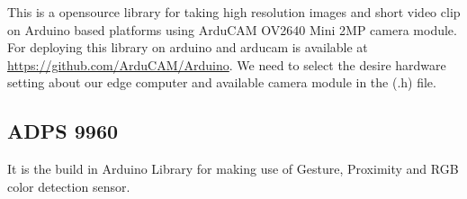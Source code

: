 {This is a opensource library for taking high resolution images and short video clip on Arduino based platforms using ArduCAM OV2640 Mini 2MP camera module. For deploying this library on arduino and arducam is available at \url{https://github.com/ArduCAM/Arduino}. We need to select the desire hardware setting about our edge computer and available camera module in the (.h) file.

\subsection{ADPS 9960}

It is the build in Arduino Library for making use of Gesture, Proximity and RGB color detection sensor.



%
%	
}